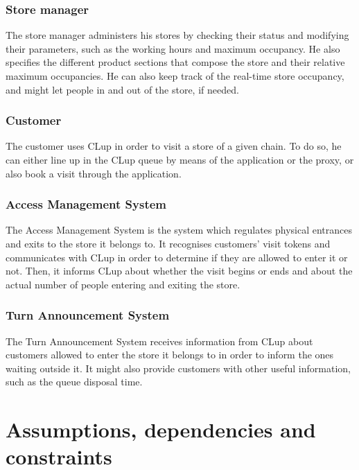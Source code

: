 \documentclass[a4paper,oneside,11pt]{book}   %
\begin{document}
    \subsubsection{Store manager}
    The store manager administers his stores by checking their status and modifying their parameters, such as the working hours and maximum occupancy. He also specifies the different product sections that compose the store and their relative maximum occupancies. He can also keep track of the real-time store occupancy, and might let people in and out of the store, if needed.
    \subsubsection{Customer}
    The customer uses CLup in order to visit a store of a given chain. To do so, he can either line up in the CLup queue by means of the application or the proxy, or also book a visit through the application. 
    \subsubsection{Access Management System}
    The Access Management System is the system which regulates physical entrances and exits to the store it belongs to. It recognises customers’ visit tokens and communicates with CLup in order to determine if they are allowed to enter it or not. Then, it informs CLup about whether the visit begins or ends and about the actual number of people entering and exiting the store.
    \subsubsection{Turn Announcement System}
    The Turn Announcement System receives information from CLup about customers allowed to enter the store it belongs to in order to inform the ones waiting outside it. It might also provide customers with other useful information, such as the queue disposal time.
    
    \section{Assumptions, dependencies and constraints}
\end{document}
